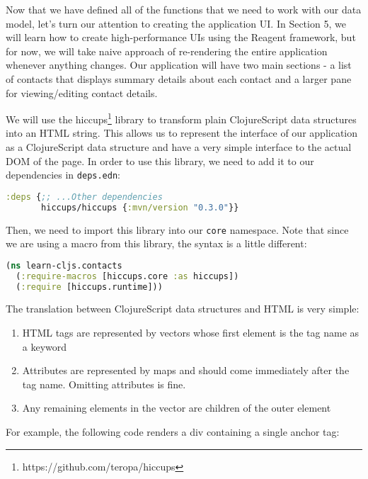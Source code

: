\documentclass[10pt,twoside,openright]{memoir}
\begin{document}
Now that we have defined all of the functions that we need to work with
our data model, let's turn our attention to creating the application UI.
In Section 5, we will learn how to create high-performance UIs using the
Reagent framework, but for now, we will take naive approach of
re-rendering the entire application whenever anything changes. Our
application will have two main sections - a list of contacts that
displays summary details about each contact and a larger pane for
viewing/editing contact details.

We will use the hiccups\footnote{https://github.com/teropa/hiccups}
library to transform plain ClojureScript data structures into an HTML
string. This allows us to represent the interface of our application as
a ClojureScript data structure and have a very simple interface to the
actual DOM of the page. In order to use this library, we need to add it
to our dependencies in \texttt{deps.edn}:

\begin{lstlisting}[language=Clojure, caption={deps.edn}]
:deps {;; ...Other dependencies
       hiccups/hiccups {:mvn/version "0.3.0"}}
\end{lstlisting}

Then, we need to import this library into our \texttt{core} namespace.
Note that since we are using a macro from this library, the syntax is a
little different:

\begin{lstlisting}[language=Clojure, caption={learn\_cljs/contacts.cljs}]
(ns learn-cljs.contacts
  (:require-macros [hiccups.core :as hiccups])
  (:require [hiccups.runtime]))
\end{lstlisting}

The translation between ClojureScript data structures and HTML is very
simple:

\begin{enumerate}
\def\labelenumi{\arabic{enumi}.}
\tightlist
\item
  HTML tags are represented by vectors whose first element is the tag
  name as a keyword
\item
  Attributes are represented by maps and should come immediately after
  the tag name. Omitting attributes is fine.
\item
  Any remaining elements in the vector are children of the outer element
\end{enumerate}

For example, the following code renders a div containing a single anchor
tag:
\end{document}
